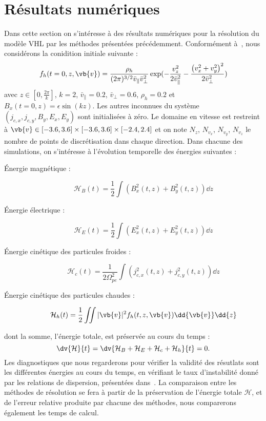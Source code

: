 
\section{Résultats numériques}

Dans cette section on s'intéresse à des résultats numériques pour la résolution du modèle VHL par les méthodes présentées précédemment. Conformément à~\cite{Holderied:2020}, nous considérons la conidition initiale suivante :
$$
  f_h(t=0,z,\vb{v}) = \frac{\rho_h}{(2\pi)^{3/2}\bar{v}_{\|}\bar{v}_\perp^2}\exp( - \frac{v_z^2}{2\bar{v}_{\|}^2} - \frac{\left( v_x^2 + v_y^2 \right)^2}{2\bar{v}_\perp^2} )
$$
avec $z\in[0,\frac{2\pi}{k}]$, $k=2$, $\bar{v}_{\|}=0.2$, $\bar{v}_\perp=0.6$, $\rho_h=0.2$ et $B_x(t=0,z)=\epsilon\sin(kz)$. Les autres inconnues du système $(j_{c,x},j_{c,y},B_y,E_x,E_y)$ sont initialisées à zéro. Le domaine en vitesse est restreint à $\vb{v}\in[-3.6,3.6]\times[-3.6,3.6]\times[-2.4,2.4]$ et on note $N_z$, $N_{v_x}$, $N_{v_y}$, $N_{v_z}$ le nombre de points de discrétisation dans chaque direction. Dans chacune des simulations, on s'intéresse à l'évolution temporelle des énergies suivantes :
\begin{description}
  \item[Énergie magnétique : ] \begin{equation}\label{eq:3:nrj:me}\mathcal{H}_B(t) = \frac{1}{2}\int \left( B_x^2(t,z) + B_y^2(t,z) \right)\dd{z}\end{equation}
  \item[Énergie électrique : ] \begin{equation}\label{eq:3:nrj:ee}\mathcal{H}_E(t) = \frac{1}{2}\int \left( E_x^2(t,z) + E_y^2(t,z) \right)\dd{z}\end{equation}
  \item[Énergie cinétique des particules froides : ] \begin{equation}\label{eq:3:nrj:ce}\mathcal{H}_c(t) = \frac{1}{2\Omega_{pe}^2}\int \left( j_{c,x}^2(t,z) + j_{c,y}^2(t,z) \right)\dd{z}\end{equation}
  \item[Énergie cinétique des particules chaudes :  ] \begin{equation}\label{eq:3:nrj:he}\mathcal{H}_h(t) = \frac{1}{2}\iint |\vb{v}|^2 f_h(t,z,\vb{v}) \dd{\vb{v}}\dd{z}\end{equation}
\end{description}
dont la somme, l'énergie totale, est préservée au cours du temps :
$$
  \dv{\mathcal{H}}{t} = \dv{\mathcal{H}_B+\mathcal{H}_E+\mathcal{H}_c+\mathcal{H}_h}{t} = 0.
$$
Les diagnostiques que nous regarderons pour vérifier la validité des résutlats sont les différentes énergies au cours du temps, en vérifiant le taux d'instabilité donné par les relations de dispersion, présentées dans~\cite{Holderied:2020}. La comparaison entre les méthodes de résolution se fera à partir de la préservation de l'énergie totale $\mathcal{H}$, et de l'erreur relative produite par chacune des méthodes, nous comparerons également les temps de calcul.

